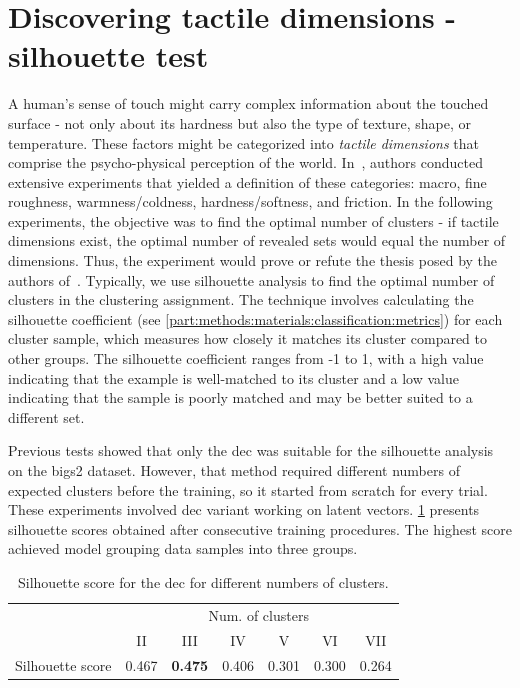 \documentclass[a4paper, 10pt, twoside]{report}
\begin{document}
\section{Discovering tactile dimensions - silhouette test}

A human's sense of touch might carry complex information about the touched surface - not only about its hardness but also the type of texture, shape, or temperature. These factors might be categorized into \textit{tactile dimensions} that comprise the psycho-physical perception of the world. In~\cite{review_on_haptic_perception}, authors conducted extensive experiments that yielded a definition of these categories: macro, fine roughness, warmness/coldness, hardness/softness, and friction. In the following experiments, the objective was to find the optimal number of clusters - if tactile dimensions exist, the optimal number of revealed sets would equal the number of dimensions. Thus, the experiment would prove or refute the thesis posed by the authors of~\cite{review_on_haptic_perception}. Typically, we use silhouette analysis to find the optimal number of clusters in the clustering assignment. The technique involves calculating the silhouette coefficient (see \ref{part:methods:materials:classification:metrics}) for each cluster sample, which measures how closely it matches its cluster compared to other groups. The silhouette coefficient ranges from -1 to 1, with a high value indicating that the example is well-matched to its cluster and a low value indicating that the sample is poorly matched and may be better suited to a different set. 

Previous tests showed that only the \acrshort{dec} was suitable for the silhouette analysis on the \acrshort{bigs2} dataset. However, that method required different numbers of expected clusters before the training, so it started from scratch for every trial. These experiments involved \acrshort{dec} variant working on latent vectors. \Table\ref{tab:silhouette_scores} presents silhouette scores obtained after consecutive training procedures. The highest score achieved model grouping data samples into three groups. 

\begin{table}[htbp!]
\centering
\begin{tabular}{c|cccccc}
                 & \multicolumn{6}{c}{Num. of clusters}          \\
                 & II    & III   & IV    & V     & VI    & VII   \\ \hline
Silhouette score & 0.467 & \textbf{0.475} & 0.406 & 0.301 & 0.300 & 0.264
\end{tabular}
    \caption{Silhouette score for the \acrshort{dec} for different numbers of clusters.}
    \label{tab:silhouette_scores}
\end{table}
\end{document}
